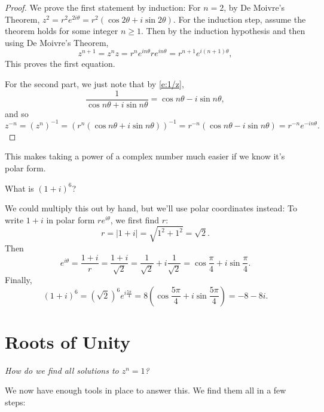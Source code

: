 \documentclass[11pt,dvipsnames]{book}
\numberwithin{equation}{section} %
\numberwithin{figure}{section} %
\numberwithin{table}{section} %
\begin{document}
\begin{proof}
We prove the first statement by induction: For $n=2$, by De Moivre's Theorem, $z^2=r^2e^{2i\theta} = r^2(\cos 2\theta+i\sin 2\theta)$. For the induction step, assume the theorem holds for some integer $n\geq 1$. Then by the induction hypothesis and then using De Moivre's Theorem,
\[
z^{n+1} = z^{n}z=r^{n}e^{in\theta} re^{in\theta} = r^{n+1}e^{i(n+1)\theta},
\]
This proves the first equation. 

For the second part, we just note that by \eqref{e:1/z},
\[
\frac{1}{\cos n \theta +i\sin n \theta} =\cos n \theta - i\sin n \theta,\]
and so
\[
z^{-n}=(z^{n})^{-1} = (r^{n}(\cos n\theta + i\sin n\theta))^{-1} = r^{-n} (\cos n \theta - i\sin n \theta) = r^{-n} e^{-i n\theta}.\]

\end{proof}

This makes taking a power of a complex number much easier if we know it's polar form. 

\begin{example}
What is $(1+i)^{6}$?
\end{example}

We could multiply this out by hand, but we'll use polar coordinates instead: To write $1+i$ in polar form $re^{i\theta}$, we first find $r$:
\[
r=|1+i|=\sqrt{1^2+1^2}=\sqrt{2}.
\]
Then 
\[
e^{i\theta} = \frac{1+i}{r} =\frac{1+i}{\sqrt{2}} = \frac{1}{\sqrt{2}}+i\frac{1}{\sqrt{2}}=\cos \frac{\pi}{4} + i\sin\frac{\pi}{4}.
\]
Finally,
\[
(1+i)^{6}= (\sqrt{2})^{6} e^{i\frac{5\pi}{4}} = 8\left(\cos \frac{5\pi}{4}+i\sin \frac{5\pi}{4}\right) = -8-8i.
\]



\section{Roots of Unity}

\begin{center}
{\it How do we find all solutions to $z^{n}=1$?
}
\end{center}
We now have enough tools in place to answer this. We find them all in a few steps:
\end{document}
